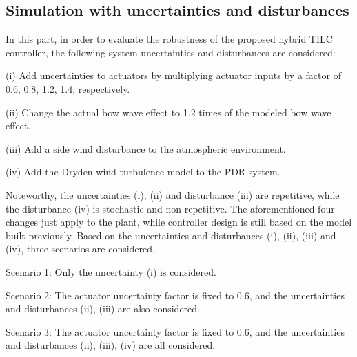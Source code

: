 \subsection{Simulation with uncertainties and disturbances}

In this part, in order to evaluate the robustness of the proposed hybrid TILC
controller, the following system uncertainties and disturbances are considered:

(i) Add uncertainties to actuators by multiplying actuator inputs by a factor
of 0.6, 0.8, 1.2, 1.4, respectively.

(ii) Change the actual bow wave effect to 1.2 times of the modeled bow
wave effect.

(iii) Add a side wind disturbance to the atmospheric environment.

(iv) Add the Dryden wind-turbulence model to the PDR system.

Noteworthy, the uncertainties (i), (ii) and disturbance (iii) are repetitive,
while the disturbance (iv) is stochastic and non-repetitive. The aforementioned four changes just apply to the plant, while controller design is still based on the model built
previously. Based on the uncertainties and disturbances (i), (ii), (iii) and
(iv), three scenarios are considered.

Scenario 1: Only the uncertainty (i) is considered.

Scenario 2: The actuator uncertainty factor is fixed to 0.6, and the uncertainties and
disturbances (ii), (iii) are also considered.

Scenario 3: The actuator uncertainty factor is fixed to 0.6, and the uncertainties and disturbances (ii), (iii), (iv) are all considered.

